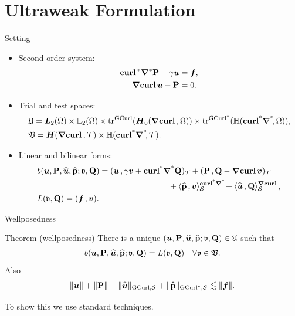 \documentclass[10pt]{beamer}
\begin{document}
\section{Ultraweak Formulation}
\begin{frame}{Setting}
\begin{itemize}
\item Second order system: 
\begin{align*}
    \Curl^{*}\Grad^{*} \PP + \gamma \bu &= \ff, \\
    \Grad\Curl \bu - \PP &= 0. 
\end{align*}
\item Trial and test spaces:
\begin{align*}
    &\UU = \bL_2(\Omega) \times \LL_2(\Omega) \times \tracegc{}(\HGradCurlz{\Omega}) \times \tra{}(\HGradCurla{\Omega}), \\
    &\VV = \HGradCurl{\cT} \times \HGradCurla{\cT}.
\end{align*}
\item Linear and bilinear forms: 
    \begin{align*}   
  & b(\bu,\PP,\tbu,\tPP;\vv,\QQ) = \vdual{\bu}{\gamma \bv+\GCurla\QQ}_{\cT}+\vdual{\PP}{\QQ-\Grad\Curl \bv }_{\cT} 
  \\& \hspace{16 em} + \dualgca{\tPP}{\bv}_{\cS}+\dualgc{\tbu}{\QQ}_{\cS}, \\ 
  &L(\vv,\QQ)=\vdual{\ff}{\bv}. 
\end{align*}
\end{itemize}
\end{frame}
\begin{frame}{Wellposedness}
\begin{block}{Theorem (wellposedness)} There is a unique $(\bu,\PP,\tbu,\tPP;\vv,\QQ) \in \UU $ such that 
\begin{align*}
    b(\bu,\PP,\tbu,\tPP;\vv,\QQ) = L(\vv,\QQ) \quad \forall \vv \in \VV.  
\end{align*}   
Also 
\begin{align*}
    \|\bu\| + \|\PP\|+\|\tbu\|_{\tGCurl,\cS}+\|\tPP\|_{\tGCurla,\cS} \lesssim \|\ff\|.
\end{align*}
\end{block}
To show this we use standard techniques. 
\end{frame}
\end{document}

